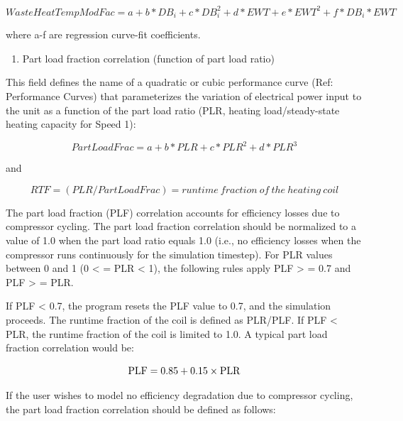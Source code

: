 \begin{equation}
WasteHeatTempModFac = a + b*D{B_i} + c*DB_i^2 + d*EWT + e*EW{T^2} + f*D{B_i}*EWT
\end{equation}

where a-f are regression curve-fit coefficients.

\begin{enumerate}
\def\labelenumi{\arabic{enumi})}
\setcounter{enumi}{7}
\tightlist
\item
  Part load fraction correlation (function of part load ratio)
\end{enumerate}

This field defines the name of a quadratic or cubic performance curve (Ref: Performance Curves) that parameterizes the variation of electrical power input to the unit as a function of the part load ratio (PLR, heating load/steady-state heating capacity for Speed 1):

\begin{equation}
PartLoadFrac = a + b*PLR + c*PL{R^2} + d*PL{R^3}
\end{equation}

and

\begin{equation}
RTF = (PLR/PartLoadFrac) = runtime~fraction~of~the~heating~coil
\end{equation}

The part load fraction (PLF) correlation accounts for efficiency losses due to compressor cycling. The part load fraction correlation should be normalized to a value of 1.0 when the part load ratio equals 1.0 (i.e., no efficiency losses when the compressor runs continuously for the simulation timestep). For PLR values between 0 and 1 (0 \textless{} = PLR \textless{} 1), the following rules apply PLF \textgreater{} = 0.7 and PLF \textgreater{} = PLR.

If PLF \textless{} 0.7, the program resets the PLF value to 0.7, and the simulation proceeds. The runtime fraction of the coil is defined as PLR/PLF. If PLF \textless{} PLR, the runtime fraction of the coil is limited to 1.0. A typical part load fraction correlation would be:

\begin{equation}
{\rm{PLF}} = 0.85 + 0.15 \times {\rm{PLR}}
\end{equation}

If the user wishes to model no efficiency degradation due to compressor cycling, the part load fraction correlation should be defined as follows:

